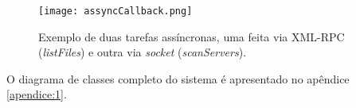         \begin{figure}[!ht]
        \centering
        \texttt{[image: assyncCallback.png]}
        \caption{Exemplo de duas tarefas assíncronas, uma feita via XML-RPC (\textit{listFiles}) e outra via \textit{socket} (\textit{scanServers}).}
        \label{fig:assyncCallback}
        \end{figure}
        
        O diagrama de classes completo do sistema é apresentado no apêndice \ref{apendice:1}.
        
    